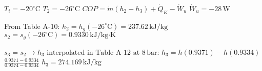 \( T_i = -20^\circ \text{C} \)  
\( T_2 = -26^\circ \text{C} \)  
\( COP = \dot{m} (h_2 - h_3) + \dot{Q}_K - \dot{W}_u \)  
\( \dot{W}_u = -28 \, \text{W} \)  

From Table A-10:  
\( h_2 = h_g(-26^\circ \text{C}) = 237.62 \, \text{kJ/kg} \)  
\( s_2 = s_g(-26^\circ \text{C}) = 0.9330 \, \text{kJ/kg·K} \)  

\( s_3 = s_2 \rightarrow h_3 \text{ interpolated in Table A-12 at } 8 \, \text{bar} \):  
\( h_3 = h(0.9371) - h(0.9334) \)  
\( \frac{0.9371 - 0.9334}{0.9374 - 0.9334} \)  
\( h_3 = 274.169 \, \text{kJ/kg} \)